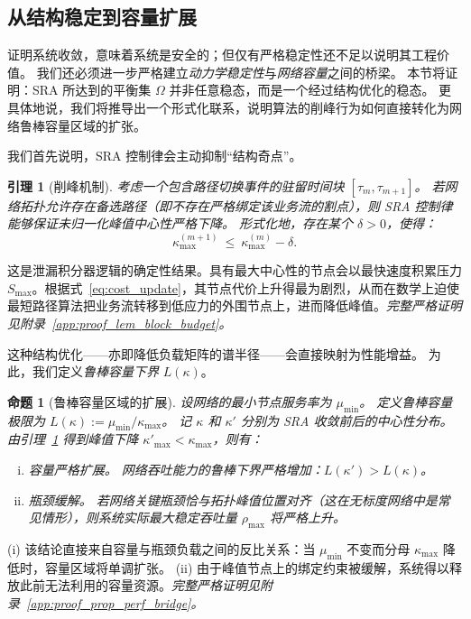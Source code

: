 \documentclass[journal]{IEEEtran}
\theoremstyle{plain}
\newtheorem{proposition}{命题}
\newtheorem{lemma}{引理}
\theoremstyle{definition}
\begin{document}
\subsection{从结构稳定到容量扩展}
\label{subsec:theory_bridge}

证明系统收敛，意味着系统是安全的；但仅有严格稳定性还不足以说明其工程价值。
我们还必须进一步严格建立\textit{动力学稳定性}与\textit{网络容量}之间的桥梁。
本节将证明：SRA 所达到的平衡集 $\Omega$ 并非任意稳态，而是一个经过结构优化的稳态。
更具体地说，我们将推导出一个形式化联系，说明算法的削峰行为如何直接转化为网络鲁棒容量区域的扩张。

我们首先说明，SRA 控制律会主动抑制“结构奇点”。

\begin{lemma}[削峰机制]
\label{lem:block-budget}
考虑一个包含路径切换事件的驻留时间块 $[\tau_m, \tau_{m+1}]$。
若网络拓扑允许存在备选路径（即不存在严格绑定该业务流的割点），则 SRA 控制律能够保证未归一化峰值中心性严格下降。
形式化地，存在某个 $\delta > 0$，使得：
\begin{equation}
\kappa^{(m+1)}_{\max}\ \le\ \kappa^{(m)}_{\max} - \delta.
\end{equation}
\end{lemma}
\begin{IEEEproof}[证明思路]
这是泄漏积分器逻辑的确定性结果。具有最大中心性的节点会以最快速度积累压力 $S_{\max}$。根据式~\eqref{eq:cost_update}，其节点代价上升得最为剧烈，从而在数学上迫使最短路径算法把业务流转移到低应力的外围节点上，进而降低峰值。\textit{完整严格证明见附录~\ref{app:proof_lem_block_budget}。}
\end{IEEEproof}

这种结构优化——亦即降低负载矩阵的谱半径——会直接映射为性能增益。
为此，我们定义\textit{鲁棒容量下界} $L(\kappa)$。

\begin{proposition}[鲁棒容量区域的扩展]
\label{prop:perf-bridge}
设网络的最小节点服务率为 $\mu_{\min}$。
定义鲁棒容量极限为 $L(\kappa):=\mu_{\min}/\kappa_{\max}$。
记 $\kappa$ 和 $\kappa'$ 分别为 SRA 收敛前后的中心性分布。
由引理~\ref{lem:block-budget} 得到峰值下降 $\kappa'_{\max} < \kappa_{\max}$，则有：
\begin{enumerate}[(i)]
\item \emph{容量严格扩展。} 网络吞吐能力的鲁棒下界严格增加：$L(\kappa') > L(\kappa)$。
\item \emph{瓶颈缓解。} 若网络关键瓶颈恰与拓扑峰值位置对齐（这在无标度网络中是常见情形），则系统实际最大稳定吞吐量 $\rho_{\max}$ 将严格上升。
\end{enumerate}
\end{proposition}
\begin{IEEEproof}[证明思路]
(i) 该结论直接来自容量与瓶颈负载之间的反比关系：当 $\mu_{\min}$ 不变而分母 $\kappa_{\max}$ 降低时，容量区域将单调扩张。
(ii) 由于峰值节点上的绑定约束被缓解，系统得以释放此前无法利用的容量资源。\textit{完整严格证明见附录~\ref{app:proof_prop_perf_bridge}。}
\end{IEEEproof}
\end{document}
